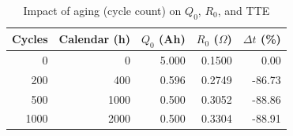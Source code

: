 \begin{table}[htbp]
\centering
\caption{Impact of aging (cycle count) on $Q_0$, $R_0$, and TTE}
\label{tab:aging_impact}
\begin{tabular}{rrrrr}
\hline
Cycles & Calendar (h) & $Q_0$ (Ah) & $R_0$ ($\Omega$) & $\Delta t$ (\%)\\
\hline
0 & 0 & 5.000 & 0.1500 & 0.00\\
200 & 400 & 0.596 & 0.2749 & -86.73\\
500 & 1000 & 0.500 & 0.3052 & -88.86\\
1000 & 2000 & 0.500 & 0.3304 & -88.91\\
\hline
\end{tabular}
\end{table}
